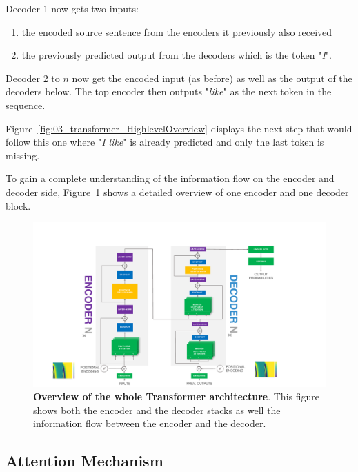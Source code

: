 Decoder 1 now gets two inputs: 

\begin{enumerate}
    \item the encoded source sentence from the encoders it previously also received
    \item the previously predicted output from the decoders which is the token "\textit{I}".
\end{enumerate}

Decoder 2 to $n$ now get the encoded input {(as before)} as well as the output of the decoders below. The top encoder then outputs "\textit{like}" as the next token in the sequence. 

Figure~\ref{fig:03_transformer_HighlevelOverview} displays the next step that would follow this one where "\textit{I like}" is already predicted and only the last token is missing.
\bigskip

To gain a complete understanding of the information flow on the encoder and decoder side, Figure~\ref{fig:03_transformer_overview} shows a detailed overview of one encoder and one decoder block.

\begin{figure}[t]
    \centering
    \includegraphics[width=\textwidth]{figures/03_theory/03_transformerArchitectureOverview}
    \caption{\textbf{Overview of the whole Transformer architecture}. This figure shows both the encoder and the decoder stacks as well the information flow between the encoder and the decoder.}
    \label{fig:03_transformer_overview}
\end{figure}

\subsection{Attention Mechanism}

